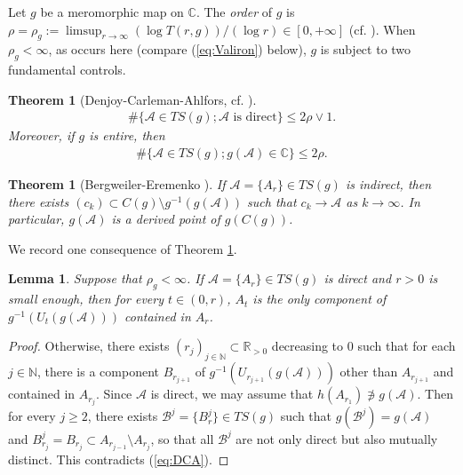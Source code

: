 \documentclass[a4paper,12pt]{amsart}
\theoremstyle{plain}
\newtheorem{theorem}[equation]{Theorem}
\newtheorem{lemma}[equation]{Lemma}
\theoremstyle{definition}
\theoremstyle{remark}
\numberwithin{equation}{section}
\begin{document}
{\smallskip {}\nopagebreak[4]}
Let $g$ be a meromorphic map on ${\mathbb{C}}$. The {\itshape order} of $g$ is
$\rho=\rho_g:=\limsup_{r\to\infty}(\log T(r,g))/(\log r)\in[0,+\infty]$
(cf. \cite[p.\ 215]{Nevan70}). 
When $\rho_g<\infty$, as occurs here (compare (\ref{eq:Valiron}) below),
$g$ is subject to two fundamental controls.

\begin{theorem}[Denjoy-Carleman-Ahlfors, cf. {\cite[p.\ 303, p. 307]{Nevan70}}]\label{th:DCA}
\begin{gather}
 \#\{\mathcal{A}\in{\mathit{TS}}(g);\mathcal{A}\text{ is direct}\}\le 2\rho\vee 1.\label{eq:DCA}
\end{gather}
Moreover, if $g$ is entire, then
\begin{gather}
 \#\{\mathcal{A}\in{\mathit{TS}}(g);g(\mathcal{A})\in{\mathbb{C}}\}\le 2\rho.\label{eq:DCAentire}
\end{gather}
\end{theorem}

\begin{theorem}[Bergweiler-Eremenko {\cite[Theorem 1']{BE95}}]\label{th:indirect}
 If $\mathcal{A}=\{A_r\}\in{\mathit{TS}}(g)$ is indirect, then
 there exists $(c_k)\subset C(g)\setminus g^{-1}(g(\mathcal{A}))$
 such that $c_k\to\mathcal{A}$ as $k\to\infty$.
 In particular, $g(\mathcal{A})$ is a derived point of $g(C(g))$. 
\end{theorem}

We record one consequence of Theorem \ref{th:DCA}.

\begin{lemma}\label{th:directunique}
 Suppose that $\rho_g<\infty$.
 If $\mathcal{A}=\{A_r\}\in{\mathit{TS}}(g)$ is direct and $r>0$ is small enough, 
 then for every $t\in(0,r)$,
 $A_t$ is the only component of $g^{-1}(U_t(g(\mathcal{A})))$ contained in $A_r$.
\end{lemma}

\begin{proof}
 Otherwise, there exists $(r_j)_{j\in{\mathbb{N}}}\subset{\mathbb{R}}_{>0}$ 
 decreasing to $0$ such that for each $j\in{\mathbb{N}}$,
 there is a component $B_{r_{j+1}}$ of $g^{-1}(U_{r_{j+1}}(g(\mathcal{A})))$
 other than $A_{r_{j+1}}$ and contained in $A_{r_j}$.
 Since $\mathcal{A}$ is direct, 
 we may assume that $h(A_{r_1})\not\ni g(\mathcal{A})$.
 Then for every $j\ge 2$, 
 there exists $\mathcal{B}^j=\{B^j_r\}\in{\mathit{TS}}(g)$ such that
 $g(\mathcal{B}^j)=g(\mathcal{A})$ and 
 $B^j_{r_j}=B_{r_j}\subset A_{r_{j-1}}\setminus A_{r_j}$,
 so that all $\mathcal{B}^j$ are not only direct but also mutually distinct.
 This contradicts (\ref{eq:DCA}).
\end{proof}
\end{document}
